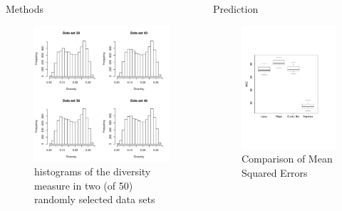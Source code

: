 \documentclass[final]{beamer}
\newlength{\onecolwid}
\newlength{\twocolwid}
\begin{document}
\begin{frame}[t]
\begin{columns}[t]
\begin{column}{\twocolwid}
\begin{columns}[t,totalwidth=\twocolwid]
\begin{column}{\onecolwid}
\begin{block}{Methods}
\begin{figure}[t]
 \includegraphics[width = .75\textwidth]{graphics/diver4hists.pdf}
\caption{histograms of the diversity measure in two (of 50) randomly selected data sets}
\end{figure}

\end{block}

\end{column} %

\begin{column}{\onecolwid}\vspace{-.6in} %


\begin{block}{Prediction}

\begin{figure}[h]
 \includegraphics[width = .5\textwidth]{graphics/Prediction_BoxPlot.pdf}
\caption{Comparison of Mean Squared Errors \label{boxplot}}
\end{figure}


\end{block}
\end{column}
\end{columns}
\end{column}
\end{columns}
\end{frame}
\end{document}

